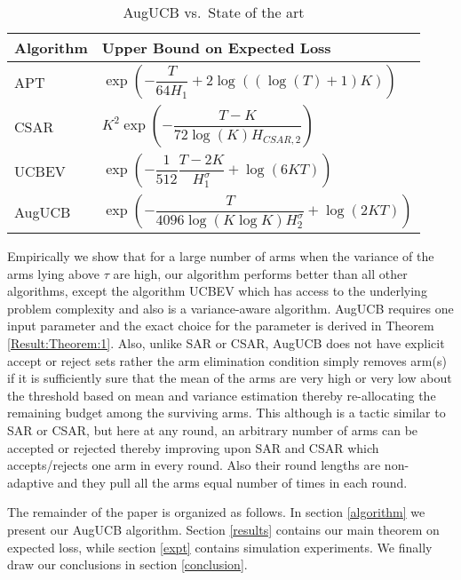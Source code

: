 \begin{table}[b]
\caption{AugUCB vs.\ State of the art}
\label{tab:regret-bds}
\begin{center}
\begin{tabular}{|p{1.3cm}|p{6.35cm}|}
\hline
Algorithm  & Upper Bound on Expected Loss \\
\hline
\hline
APT         &$\exp\left(-\dfrac{T}{64 H_1}+2\log((\log(T)+1)K)\right)$ \\
\hline
\hline
CSAR		&$K^2\exp\left(-\dfrac{T-K}{72\log(K)H_{CSAR,2}}\right)$ \\
\hline
\hline
UCBEV		&$\exp\left(-\dfrac{1}{512}\dfrac{T-2K}{H_1^{\sigma}} + \log\left(6KT\right)\right)$ \\
\hline
\hline
AugUCB      &$ \exp\left(- \dfrac{T}{4096 \log(K\log K)H_{2}^{\sigma}} + \log\left(2KT\right) \right) $ \\
\hline
\end{tabular}
\end{center}
\end{table}
Empirically we show that for a large number of arms when the variance of the arms lying above $\tau$ are high, our algorithm performs better than all other algorithms, except the algorithm UCBEV which has access to the underlying problem complexity and also is a variance-aware algorithm. AugUCB requires one input parameter and the exact choice for the parameter is derived in Theorem \ref{Result:Theorem:1}. Also, unlike SAR or CSAR, AugUCB does not have explicit accept or reject sets rather the arm elimination condition simply removes arm(s) if it is sufficiently sure that the mean of the arms are very high or very low about the threshold based on mean and variance estimation thereby re-allocating the remaining budget among the surviving arms. This although is a tactic similar to SAR or CSAR, but here at any round, an arbitrary number of arms can be accepted or rejected thereby improving upon SAR and CSAR which accepts/rejects one arm in every round. Also their round lengths are non-adaptive and they pull all the arms equal number of times in each round. 

The remainder of the paper is organized as follows. In section \ref{algorithm} we present our AugUCB algorithm. 
Section \ref{results} contains our main theorem on expected loss, while section \ref{expt} contains simulation experiments. We finally draw our conclusions in section \ref{conclusion}.

